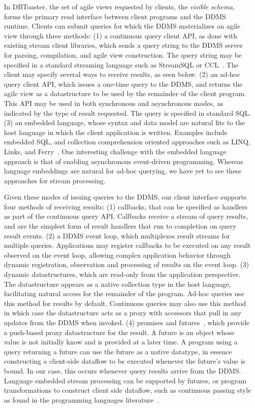 In DBToaster, the set of agile views requested by clients, the \textit{visible
schema}, forms the primary read interface between client programs and the DDMS
runtime. Clients can submit queries for which the DDMS materializes an agile
view through three methods:
(1) a continuous query client API, as done with existing stream client
libraries, which sends a query string to the DDMS server for parsing,
compilation, and agile view construction. The query string may be specified in a
standard streaming language such as StreamSQL or CCL~\cite{jain-pvldb:08}. The
client may specify several ways to receive results, as seen below.
(2) an ad-hoc query client API, which issues a one-time query to the
DDMS, and returns the agile view as a datastructure to be used by the remainder
of the client program. This API may be used in both synchronous and
asynchronous modes, as indicated by the type of result requested. The query is
specified in standard SQL.
(3) an embedded language, whose syntax and data model are natural fits to the
host language in which the client application is written. Examples include
embedded SQL, and collection comprehension oriented approaches such as LINQ,
Links, and Ferry~\cite{meijer-sigmod:06,cooper-fmco:06,grust-sigmod:09}.
One interesting challenge with the embedded language approach is that of
enabling asynchronous event-driven programming. Whereas language embeddings
are natural for ad-hoc querying, we have yet to see these approaches
for stream processing.

Given these modes of issuing queries to the DDMS, our client interface supports
four methods of receiving results:
(1) callbacks, that can be specified as handlers as part of the continuous query
API. Callbacks receive a stream of query results, and are the simplest form of
result handlers that run to completion on query result events.  
(2) a DDMS event loop, which multiplexes result streams for multiple queries.
Applications may register callbacks to be executed on any result observed on the
event loop, allowing complex application behavior through dynamic
registration, observation and processing of results on the event loop.
(3) dynamic datastructures, which are read-only from the application
perspective. The datastructure appears as a native collection type in the host
language, facilitating natural access for the remainder of the program. Ad-hoc
queries use this method for results by default. Continuous queries may also use
this method in which case the datastructure acts as a proxy with accessors that
pull in any updates from the DDMS when invoked.
(4) promises and futures~\cite{Liskov:1988:PLS:53990.54016}, which provide a
push-based proxy datastructure for the
result. A future is an object whose value is not initially know and is provided
at a later time. A program using a query returning a future can use the future
as a native datatype, in essence constructing a client-side dataflow to be
executed whenever the future's value is bound. In our case, this occurs whenever
query results arrive from the DDMS. Language embedded stream processing can be
supported by futures, or program transformations to construct client side
dataflow, such as continuous passing style as found in the programming languages
literature~\cite{sussman-hsc:98}.


